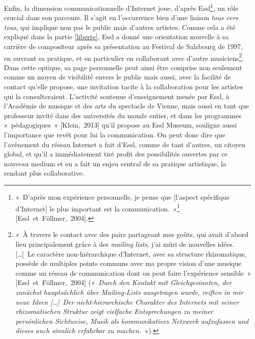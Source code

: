 \documentclass[a4paper,12pt]{article}
\newcommand{\guill}[1]{«~#1~»}
\newcommand{\tpp}[0]{[\dots]}
\newcommand{\cicite}[1]{{\footnotesize[#1]}}
\begin{document}
Enfin, la dimension communicationnelle d'Internet joue, d'après Essl\footnote{\guill{D'après mon expérience personnelle, je pense que [l'aspect spécifique d'Internet] le plus important est la communication.}\footnote{\guill{\emph{GF\!: Do you think that the net has a specific musical potential\!? --- KHE\!: From my personal experience, I think that the most important thing is the communication aspect.}}} \cicite{Essl~et~Föllmer,~2004}.}, un rôle crucial dans son parcours. Il s'agit en l'occurrence bien d'une liaison \emph{tous vers tous}, qui implique non pas le public mais d'autres artistes. Comme cela a été expliqué dans la partie \ref{liberte}, Essl a donné une orientation nouvelle à sa carrière de compositeur après sa présentation au Festival de Salzbourg de 1997, en ouvrant sa pratique, et en particulier en collaborant avec d'autre musiciens\footnote{\guill{À travers le contact avec des pairs partageant mes goûts, qui avait d'abord lieu principalement grâce à des \emph{mailing lists}, j'ai mûri de nouvelles idées. \tpp~Le caractère non-hiérarchique d'Internet, avec sa structure rhizomatique, possède de multiples points communs avec ma propre vision d'une musique comme un réseau de communication dont on peut faire l'expérience sensible} \cicite{Essl~et~Föllmer,~2004} (\guill{\emph{Durch den Kontakt mit Gleichgesinnten, der zunächst hauptsächlich über Mailing-Lists ausgetragen wurde, reiften in mir neue Ideen \tpp~Der nicht-hierarchische Charakter des Internets mit seiner rhizomatischen Struktur zeigt vielfache Entsprechungen zu meiner persönlichen Sichtweise, Musik als kommunikatives Netzwerk aufzufassen und dieses auch sinnlich erfahrbar zu machen.}}).}. Dans cette optique, sa page personnelle peut ainsi être comprise non seulement comme un moyen de visibilité envers le public mais aussi, avec la facilité de contact qu'elle propose, une invitation tacite à la collaboration pour les artistes qui la consulteraient. L'activité soutenue d'enseignement menée par Essl, à l'Académie de musique et des arts du spectacle de Vienne, mais aussi en tant que professeur invité dans des universités du monde entier, et dans les programmes \guill{pédagogiques} \cicite{Klein,~2013} qu'il propose au Essl Museum, souligne aussi l'importance que revêt pour lui la communication. On peut donc dire que l'avènement du réseau Internet a fait d'Essl, comme de tant d'autres, un citoyen global, et qu'il a immédiatement tiré profit des possibilités ouvertes par ce nouveau medium et en a fait un enjeu central de sa pratique artistique, la rendant plus collaborative.
\end{document}
